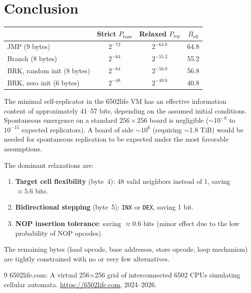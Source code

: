 \documentclass{article}
\newcommand{\opcode}[1]{\texttt{#1}}
\newcommand{\Beff}{B_{\mathrm{eff}}}
\newcommand{\Pbase}{P_{\mathrm{base}}}
\newcommand{\Prep}{P_{\mathrm{rep}}}
\begin{document}
\section{Conclusion}
\label{sec:conclusion}

\begin{center}
\begin{tabular}{lccc}
\toprule
& Strict $\Pbase$ & Relaxed $\Prep$ & $\Beff$ \\
\midrule
JMP (9 bytes) & $2^{-72}$ & $2^{-64.8}$ & 64.8 \\
Branch (8 bytes) & $2^{-64}$ & $2^{-55.2}$ & 55.2 \\
BRK, random init (8 bytes)\footnotemark & $2^{-64}$ & $2^{-56.8}$ & 56.8 \\
BRK, zero init (6 bytes) & $2^{-48}$ & $2^{-40.8}$ & 40.8 \\
\bottomrule
\end{tabular}
\end{center}


The minimal self-replicator in the 6502life VM has an effective
information content of approximately 41--57 bits, depending on the
assumed initial conditions. Spontaneous emergence on a standard
$256 \times 256$ board is negligible ($\sim 10^{-8}$ to $10^{-15}$
expected replicators). A board of side $\sim 10^6$ (requiring
$\sim$1.8 TiB) would be needed for spontaneous replication to be
expected under the most favorable assumptions.

The dominant relaxations are:
\begin{enumerate}
\item \textbf{Target cell flexibility} (byte~4): 48 valid neighbors
  instead of 1, saving $\approx 5.6$ bits.
\item \textbf{Bidirectional stepping} (byte~5): \opcode{INX} or
  \opcode{DEX}, saving 1 bit.
\item \textbf{NOP insertion tolerance}: saving $\approx 0.6$ bits
  (minor effect due to the low probability of NOP opcodes).
\end{enumerate}

The remaining bytes (load opcode, base addresses, store opcode, loop
mechanism) are tightly constrained with no or very few alternatives.

\begin{thebibliography}{9}
6502life.com: A virtual 256$\times$256 grid of interconnected 6502 CPUs
simulating cellular automata.
\url{https://6502life.com}, 2024--2026.
\end{thebibliography}
\end{document}
